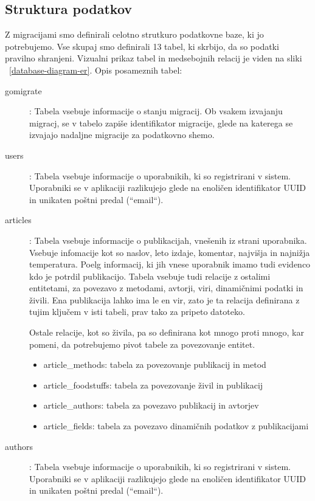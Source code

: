 \documentclass[a4paper, 12pt]{book}
\begin{document}
\subsection{ Struktura podatkov }
Z migracijami smo definirali celotno strutkuro podatkovne baze, ki jo potrebujemo. Vse skupaj smo definirali 13 tabel, ki skrbijo, da so podatki pravilno shranjeni. Vizualni prikaz tabel in medsebojnih relacij je viden na sliki ~\ref{database-diagram-er}. Opis posameznih tabel:
\begin{description}
\item[gomigrate]: Tabela vsebuje informacije o stanju migracij. Ob vsakem izvajanju migracj, se v tabelo zapiše identifikator migracije, glede na katerega se izvajajo nadaljne migracije za podatkovno shemo. 

\item[users]: Tabela vsebuje informacije o uporabnikih, ki so registrirani v sistem. Uporabniki se v aplikaciji razlikujejo glede na enoličen identifikator UUID in unikaten poštni predal (``email``). 

\item[articles]: Tabela vsebuje informacije o publikacijah, vnešenih iz strani uporabnika. Vsebuje infomacije kot so naslov, leto izdaje, komentar, najvišja in najnižja temperatura. Poelg informacij, ki jih vnese uporabnik imamo tudi evidenco kdo je potrdil publikacijo. Tabela vsebuje tudi relacije z ostalimi entitetami, za povezavo z metodami, avtorji, viri, dinamičnimi podatki in živili. Ena publikacija lahko ima le en vir, zato je ta relacija definirana z tujim ključem v isti tabeli, prav tako za pripeto datoteko. 

Ostale relacije, kot so živila, pa so definirana kot mnogo proti mnogo, kar pomeni, da potrebujemo pivot tabele za povezovanje entitet.
\begin{itemize}
    \item article\_methods: tabela za povezovanje publikacij in metod
    \item article\_foodstuffs: tabela za povezovanje živil in publikacij
    \item article\_authors: tabela za povezavo publikacij in avtorjev
    \item article\_fields: tabela za povezavo dinamičnih podatkov z publikacijami
\end{itemize}

\item[authors]: Tabela vsebuje informacije o uporabnikih, ki so registrirani v sistem. Uporabniki se v aplikaciji razlikujejo glede na enoličen identifikator UUID in unikaten poštni predal (``email``). 


\end{description}
\end{document}
